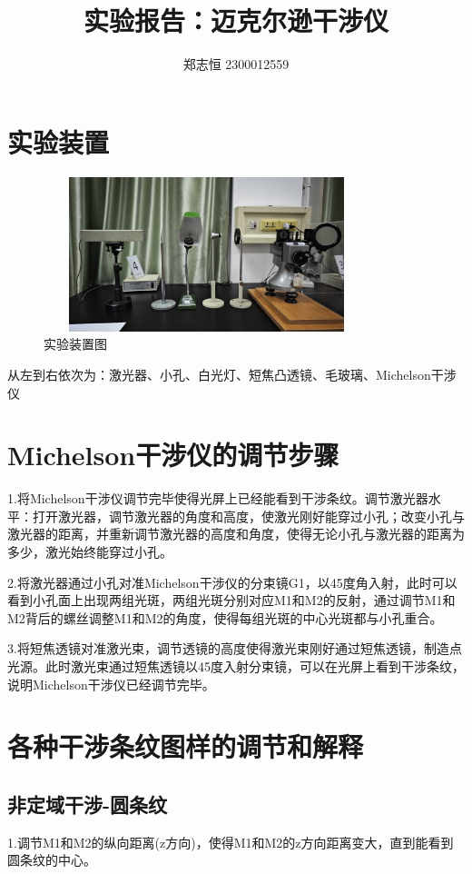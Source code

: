 \documentclass[a4paper, 10pt]{article}
\begin{document}
  \title{实验报告：迈克尔逊干涉仪}
  \author{郑志恒 2300012559}
  \maketitle
\section{实验装置}
\begin{figure}[h]
    \centering %
    \includegraphics[height=4.5cm,width=9.5cm]{p1.jpg}
    
    \caption{实验装置图}
    
    \label{2}
    
\end{figure}
\noindent 从左到右依次为：激光器、小孔、白光灯、短焦凸透镜、毛玻璃、Michelson干涉仪

\section{Michelson干涉仪的调节步骤}
\noindent 1.将Michelson干涉仪调节完毕使得光屏上已经能看到干涉条纹。调节激光器水平：打开激光器，调节激光器的角度和高度，使激光刚好能穿过小孔；改变小孔与激光器的距离，并重新调节激光器的高度和角度，使得无论小孔与激光器的距离为多少，激光始终能穿过小孔。

\noindent 2.将激光器通过小孔对准Michelson干涉仪的分束镜G1，以45度角入射，此时可以看到小孔面上出现两组光斑，两组光斑分别对应M1和M2的反射，通过调节M1和M2背后的螺丝调整M1和M2的角度，使得每组光斑的中心光斑都与小孔重合。

\noindent 3.将短焦透镜对准激光束，调节透镜的高度使得激光束刚好通过短焦透镜，制造点光源。此时激光束通过短焦透镜以45度入射分束镜，可以在光屏上看到干涉条纹，说明Michelson干涉仪已经调节完毕。
\section{各种干涉条纹图样的调节和解释}
\subsection{非定域干涉-圆条纹}
\noindent 1.调节M1和M2的纵向距离(z方向)，使得M1和M2的z方向距离变大，直到能看到圆条纹的中心。
\end{document}
